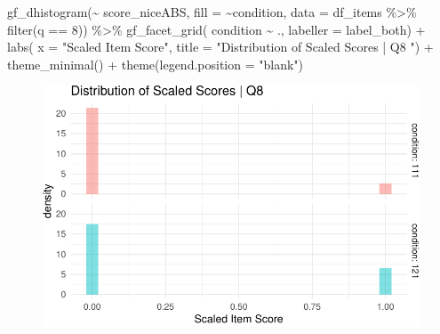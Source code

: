 \documentclass[
  letterpaper,
  DIV=11,
  numbers=noendperiod]{scrreprt}
\newenvironment{Shaded}{\begin{snugshade}}{\end{snugshade}}
\newcommand{\AttributeTok}[1]{\textcolor[rgb]{0.40,0.45,0.13}{#1}}
\newcommand{\DecValTok}[1]{\textcolor[rgb]{0.68,0.00,0.00}{#1}}
\newcommand{\FunctionTok}[1]{\textcolor[rgb]{0.28,0.35,0.67}{#1}}
\newcommand{\NormalTok}[1]{\textcolor[rgb]{0.00,0.23,0.31}{#1}}
\newcommand{\SpecialCharTok}[1]{\textcolor[rgb]{0.37,0.37,0.37}{#1}}
\newcommand{\StringTok}[1]{\textcolor[rgb]{0.13,0.47,0.30}{#1}}
\begin{document}
\begin{Shaded}
\begin{Highlighting}[]
\FunctionTok{gf\_dhistogram}\NormalTok{(}\SpecialCharTok{\textasciitilde{}}\NormalTok{ score\_niceABS, }\AttributeTok{fill =} \SpecialCharTok{\textasciitilde{}}\NormalTok{condition, }\AttributeTok{data =}\NormalTok{ df\_items }\SpecialCharTok{\%\textgreater{}\%} \FunctionTok{filter}\NormalTok{(q }\SpecialCharTok{==} \DecValTok{8}\NormalTok{)) }\SpecialCharTok{\%\textgreater{}\%} 
  \FunctionTok{gf\_facet\_grid}\NormalTok{( condition }\SpecialCharTok{\textasciitilde{}}\NormalTok{ ., }\AttributeTok{labeller =}\NormalTok{ label\_both) }\SpecialCharTok{+} 
  \FunctionTok{labs}\NormalTok{( }\AttributeTok{x =} \StringTok{"Scaled Item Score"}\NormalTok{, }\AttributeTok{title =} \StringTok{"Distribution of Scaled Scores | Q8 "}\NormalTok{) }\SpecialCharTok{+} 
  \FunctionTok{theme\_minimal}\NormalTok{() }\SpecialCharTok{+} \FunctionTok{theme}\NormalTok{(}\AttributeTok{legend.position =} \StringTok{"blank"}\NormalTok{)}
\end{Highlighting}
\end{Shaded}

\begin{figure}[H]

{\centering \includegraphics{analysis/SGC3A/2_sgc3A_scoring_files/figure-pdf/Q8-distribution-1.pdf}

}

\end{figure}
\end{document}
